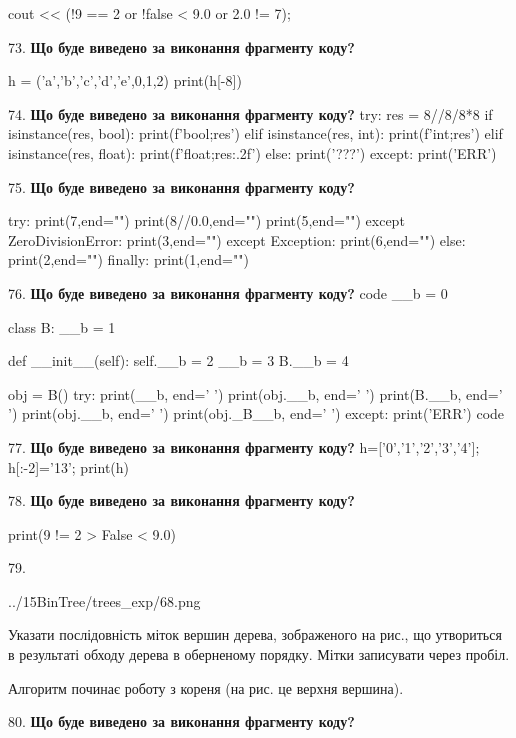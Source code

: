 \documentclass[11pt]{article}
\begin{document}
cout << (!9 == 2 or !false < 9.0 or 2.0 != 7);
\par\vspace{5mm}
73. \textbf{Що буде виведено за виконання фрагменту коду?}

h = ('a','b','c','d','e',0,1,2)
print(h[-8])

\par\vspace{5mm}
74. \textbf{Що буде виведено за виконання фрагменту коду?}
try:
    res = 8//8/8*8
    if isinstance(res, bool):
        print(f'bool;{res}')
    elif isinstance(res, int):
        print(f'int;{res}')
    elif isinstance(res, float):
        print(f'float;{res:.2f}')
    else:
        print('???')
except:
    print('ERR')
\par\vspace{5mm}
75. \textbf{Що буде виведено за виконання фрагменту коду?}

try:
    print(7,end="")
    print(8//0.0,end="")
    print(5,end="")
except ZeroDivisionError: print(3,end="")
except Exception: print(6,end="")
else: print(2,end="")
finally: print(1,end="")
\par\vspace{5mm}
76. \textbf{Що буде виведено за виконання фрагменту коду?}
code
__b = 0

class B:
    __b = 1
    
    def __init__(self):
        self.__b = 2
        __b = 3
        B.__b = 4

obj = B()
try:
    print(__b, end=' ')
    print(obj.__b, end=' ')
    print(B.__b, end=' ')
    print(obj.__b, end=' ')
    print(obj._B__b, end=' ')
except:
    print('ERR')
code
\par\vspace{5mm}
77. \textbf{Що буде виведено за виконання фрагменту коду?}
h=['0','1','2','3','4']; h[:-2]='13'; print(h)\par\vspace{5mm}
78. \textbf{Що буде виведено за виконання фрагменту коду?}

print(9 != 2 > False < 9.0)
\par\vspace{5mm}
79. 

\begin{center}
	{../15BinTree/trees_exp/68.png}
\end{center}
Указати послідовність міток вершин дерева, зображеного на рис., що утвориться в результаті обходу дерева в оберненому порядку. Мітки записувати через пробіл.\par Алгоритм починає роботу з кореня (на рис. це верхня вершина).
\par\vspace{5mm}
80. \textbf{Що буде виведено за виконання фрагменту коду?}
\end{document}
